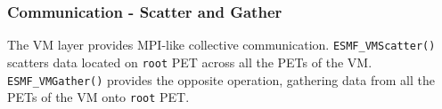  
\setlength{\oldparskip}{\parskip}
\setlength{\parskip}{1.5ex}
\setlength{\oldparindent}{\parindent}
\setlength{\parindent}{0pt}
\setlength{\oldbaselineskip}{\baselineskip}
\setlength{\baselineskip}{11pt}
 
\def\bv{\begin{verbatim}}
\def\ev{\end{verbatim}}
\def\be{\begin{equation}}
\def\ee{\end{equation}}
\def\bea{\begin{eqnarray}}
\def\eea{\end{eqnarray}}
\def\bi{\begin{itemize}}
\def\ei{\end{itemize}}
\def\bn{\begin{enumerate}}
\def\en{\end{enumerate}}
\def\bd{\begin{description}}
\def\ed{\end{description}}
\def\({\left (}
\def\){\right )}
\def\[{\left [}
\def\]{\right ]}
\def\<{\left  \langle}
\def\>{\right \rangle}
\def\cI{{\cal I}}
\def\diag{\mathop{\rm diag}}
\def\tr{\mathop{\rm tr}}


 

  
   \subsubsection{Communication - Scatter and Gather}
  
   The VM layer provides MPI-like collective communication. {\tt ESMF\_VMScatter()}
   scatters data located on {\tt root} PET across all the PETs of the VM. 
   {\tt ESMF\_VMGather()} provides the opposite operation, gathering data from
   all the PETs of the VM onto {\tt root} PET.
   

